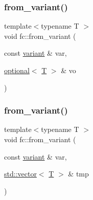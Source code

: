 \mbox{\label{namespacefc_afddde6a5bc786ecd2e7e4958a7bc3875}} 
\subsubsection{\texorpdfstring{from\+\_\+variant()}{from\_variant()}\hspace{0.1cm}{\footnotesize\ttfamily [16/17]}}
{\footnotesize\ttfamily template$<$typename T $>$ \\
void fc\+::from\+\_\+variant (\begin{DoxyParamCaption}\item[{const \mbox{\hyperlink{classfc_1_1variant}{variant}} \&}]{var,  }\item[{\mbox{\hyperlink{classfc_1_1optional}{optional}}$<$ \mbox{\hyperlink{struct_t}{T}} $>$ \&}]{vo }\end{DoxyParamCaption})}

\mbox{\label{namespacefc_a27b41c990abb0b1ea52985d4fe773ace}} 
\subsubsection{\texorpdfstring{from\+\_\+variant()}{from\_variant()}\hspace{0.1cm}{\footnotesize\ttfamily [17/17]}}
{\footnotesize\ttfamily template$<$typename T $>$ \\
void fc\+::from\+\_\+variant (\begin{DoxyParamCaption}\item[{const \mbox{\hyperlink{classfc_1_1variant}{variant}} \&}]{var,  }\item[{\mbox{\hyperlink{classstd_1_1vector}{std\+::vector}}$<$ \mbox{\hyperlink{struct_t}{T}} $>$ \&}]{tmp }\end{DoxyParamCaption})}

\mbox{\label{namespacefc_ac76f6058bf7a33bb07ab1a147eeb24bf}} 
